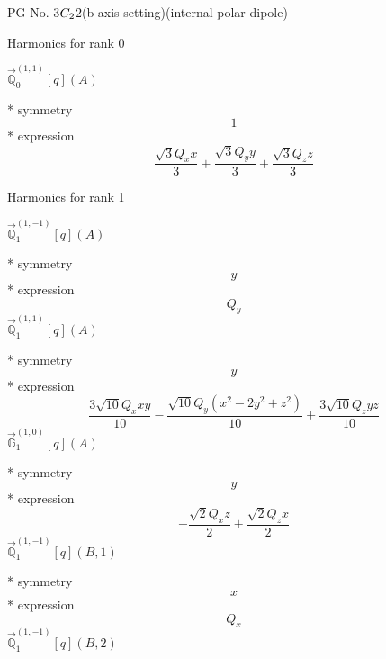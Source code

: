 \documentclass[fleqn,8pt]{jsarticle}
\begin{document}
\setcounter{MaxMatrixCols}{32}

\renewcommand{\tablename}{Table~}
\renewcommand{\figurename}{Figure~}
\begin{center}
\LARGE
PG No. 3\quad$C_{\rm 2}$\quad$2$\quad(b-axis setting)\quad[ monoclinic ] (internal polar dipole)
\end{center}

\noindent * Harmonics for rank 0

\noindent\quad $\vec{\mathbb{Q}}_{0}^{(1,1)}[q](A)$

\noindent\quad ** symmetry
\begin{dmath*}
1
\end{dmath*}
\noindent\quad ** expression
\begin{dmath*}
\frac{\sqrt{3} Q_{x} x}{3} + \frac{\sqrt{3} Q_{y} y}{3} + \frac{\sqrt{3} Q_{z} z}{3}
\end{dmath*}

\noindent * Harmonics for rank 1

\noindent\quad $\vec{\mathbb{Q}}_{1}^{(1,-1)}[q](A)$

\noindent\quad ** symmetry
\begin{dmath*}
y
\end{dmath*}
\noindent\quad ** expression
\begin{dmath*}
Q_{y}
\end{dmath*}
\noindent\quad $\vec{\mathbb{Q}}_{1}^{(1,1)}[q](A)$

\noindent\quad ** symmetry
\begin{dmath*}
y
\end{dmath*}
\noindent\quad ** expression
\begin{dmath*}
\frac{3 \sqrt{10} Q_{x} x y}{10} - \frac{\sqrt{10} Q_{y} \left(x^{2} - 2 y^{2} + z^{2}\right)}{10} + \frac{3 \sqrt{10} Q_{z} y z}{10}
\end{dmath*}
\noindent\quad $\vec{\mathbb{G}}_{1}^{(1,0)}[q](A)$

\noindent\quad ** symmetry
\begin{dmath*}
y
\end{dmath*}
\noindent\quad ** expression
\begin{dmath*}
- \frac{\sqrt{2} Q_{x} z}{2} + \frac{\sqrt{2} Q_{z} x}{2}
\end{dmath*}
\noindent\quad $\vec{\mathbb{Q}}_{1}^{(1,-1)}[q](B,1)$

\noindent\quad ** symmetry
\begin{dmath*}
x
\end{dmath*}
\noindent\quad ** expression
\begin{dmath*}
Q_{x}
\end{dmath*}
\noindent\quad $\vec{\mathbb{Q}}_{1}^{(1,-1)}[q](B,2)$
\end{document}
